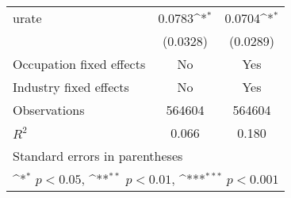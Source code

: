 {
\def\sym#1{\ifmmode^{#1}\else\(^{#1}\)\fi}
\begin{tabular}{l*{2}{c}}
\hline\hline
\hline
urate                              &      0.0783\sym{*}  &      0.0704\sym{*}  \\
                                   &    (0.0328)         &    (0.0289)         \\
[1em]
Occupation fixed effects           &          No         &         Yes         \\
[1em]
Industry fixed effects             &          No         &         Yes         \\
\hline
Observations                       &      564604         &      564604         \\
\(R^{2}\)                          &       0.066         &       0.180         \\
\hline\hline
\multicolumn{3}{l}{\footnotesize Standard errors in parentheses}\\
\multicolumn{3}{l}{\footnotesize \sym{*} \(p<0.05\), \sym{**} \(p<0.01\), \sym{***} \(p<0.001\)}\\
\end{tabular}
}
